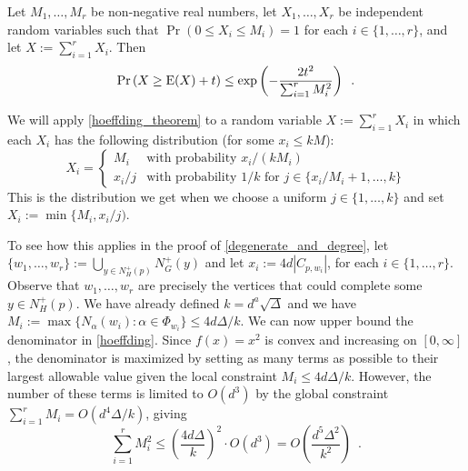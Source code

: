 \documentclass{patmorin}
\begin{document}
\begin{thm}\label{hoeffding_theorem}
  Let $M_1,\ldots,M_r$ be non-negative real numbers, let $X_1,\ldots,X_r$ be independent random variables such that $\Pr(0\le X_i\le M_i)=1$ for each $i\in\{1,\ldots,r\}$, and let $X:=\sum_{i=1}^r X_i$. Then
  \begin{equation}
    \Pr\left(X \ge \mathrm{E}(X)+ t\right)
      \le \exp\left(-\frac{2t^2}{\sum_{i=1}^r M_i^2}\right) \enspace . \label{hoeffding}
  \end{equation}
\end{thm}
We will apply \cref{hoeffding_theorem} to a random variable $X:=\sum_{i=1}^r X_i$ in which each $X_i$ has the following distribution (for some $x_i\le kM$):
\[
  X_i = \begin{cases}
          M_i & \text{with probability $x_i/(kM_i)$} \\
          x_i/j & \text{with probability $1/k$ for $j\in\{x_i/M_i+1,\ldots,k\}$}
        \end{cases}
\]
This is the distribution we get when we choose a uniform $j\in\{1,\ldots,k\}$ and set $X_i:=\min\{M_i,x_i/j)$.


To see how this applies in the proof of \cref{degenerate_and_degree}, let $\{w_1,\ldots,w_r\}:=\bigcup_{y\in N^+_H(p)} N^+_G(y)$ and let $x_i:=4d|C_{p,w_i}|$, for each $i\in\{1,\ldots,r\}$.
Observe that $w_1,\ldots,w_r$ are precisely the vertices that could complete some $y\in N^+_H(p)$.  We have already defined $k=d^a\sqrt{\Delta}$ and we have $M_i:=\max\{N_\alpha(w_i):\alpha \in \Phi_{w_i}\}\le 4d\Delta/k$.  We can now upper bound the denominator in \cref{hoeffding}.  Since $f(x)=x^2$ is convex and increasing on $[0,\infty]$, the denominator is maximized by setting as many terms as possible to their largest allowable value given the local constraint $M_i \le 4d\Delta/k$.  However, the number of these terms is limited to $O(d^3)$ by the global constraint $\sum_{i=1}^r M_i= O(d^4\Delta/k)$, giving
\[
    \sum_{i=1}^r M_i^2 \le \left(\frac{4d\Delta}{k}\right)^2\cdot O(d^3) = O\left(\frac{d^5\Delta^2}{k^2}\right) \enspace .
\]

\end{document}
